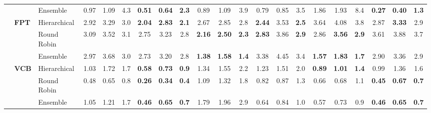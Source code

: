 {\begin{longtable}{@{\extracolsep{\fill}}lllccc|ccc|ccc|ccc|ccc|ccc}
 &  & Ensemble & 0.97 & 1.09 & 4.3 & \textbf{0.51} & \textbf{0.64} & \cellcolor{colorens}\textbf{2.3} & 0.89 & 1.09 & 3.9 & \cellcolor{colorens}0.79 & \cellcolor{colorens}0.85 & \cellcolor{colorens}3.5 & 1.86 & 1.93 & 8.4 & \cellcolor{colorens}\textbf{0.27} & \cellcolor{colorens}\textbf{0.40} & \cellcolor{colorens}\textbf{1.3} \\
\cmidrule(lr){2-21}
 & \multirow{3}{*}{\textbf{FPT}} & Hierarchical & \cellcolor{colorhier}2.92 & \cellcolor{colorhier}3.29 & \cellcolor{colorhier}3.0 & \cellcolor{colorhier}\textbf{2.04} & \cellcolor{colorhier}\textbf{2.83} & \cellcolor{colorhier}\textbf{2.1} & 2.67 & 2.85 & 2.8 & \cellcolor{colorhier}\textbf{2.44} & \cellcolor{colorhier}3.53 & \cellcolor{colorhier}\textbf{2.5} & 3.64 & 4.08 & 3.8 & \cellcolor{colorhier}2.87 & \cellcolor{colorhier}\textbf{3.33} & \cellcolor{colorhier}2.9 \\
 &  & Round Robin & 3.09 & 3.52 & 3.1 & 2.75 & 3.23 & 2.8 & \textbf{2.16} & \textbf{2.50} & \textbf{2.3} & \textbf{2.83} & 3.86 & \textbf{2.9} & 2.86 & \textbf{3.56} & \textbf{2.9} & 3.61 & 3.88 & 3.7 \\
 &  & Ensemble & 2.97 & 3.68 & \cellcolor{colorens}3.0 & 2.73 & 3.20 & 2.8 & \cellcolor{colorens}\textbf{1.38} & \cellcolor{colorens}\textbf{1.58} & \cellcolor{colorens}\textbf{1.4} & 3.38 & 4.45 & 3.4 & \cellcolor{colorens}\textbf{1.57} & \cellcolor{colorens}\textbf{1.83} & \cellcolor{colorens}\textbf{1.7} & 2.90 & 3.36 & \cellcolor{colorens}2.9 \\
\cmidrule(lr){2-21}
 & \multirow{3}{*}{\textbf{VCB}} & Hierarchical & 1.03 & 1.72 & 1.7 & \textbf{0.58} & \textbf{0.73} & \textbf{0.9} & 1.34 & 1.55 & 2.2 & 1.23 & 1.51 & 2.0 & \textbf{0.89} & \textbf{1.01} & \textbf{1.4} & 0.99 & 1.36 & 1.6 \\
 &  & Round Robin & \cellcolor{colorrr}0.48 & \cellcolor{colorrr}0.65 & \cellcolor{colorrr}0.8 & \cellcolor{colorrr}\textbf{0.26} & \cellcolor{colorrr}\textbf{0.34} & \cellcolor{colorrr}\textbf{0.4} & \cellcolor{colorrr}1.09 & \cellcolor{colorrr}1.32 & \cellcolor{colorrr}1.8 & 0.82 & 0.87 & 1.3 & 0.66 & \cellcolor{colorrr}0.68 & 1.1 & \cellcolor{colorrr}\textbf{0.45} & \textbf{0.67} & \cellcolor{colorrr}\textbf{0.7} \\
 &  & Ensemble & 1.05 & 1.21 & 1.7 & \textbf{0.46} & \textbf{0.65} & \textbf{0.7} & 1.79 & 1.96 & 2.9 & \cellcolor{colorens}0.64 & \cellcolor{colorens}0.84 & \cellcolor{colorens}1.0 & \cellcolor{colorens}0.57 & 0.73 & \cellcolor{colorens}0.9 & \textbf{0.46} & \cellcolor{colorens}\textbf{0.65} & \cellcolor{colorens}\textbf{0.7} \\

\end{longtable}}
